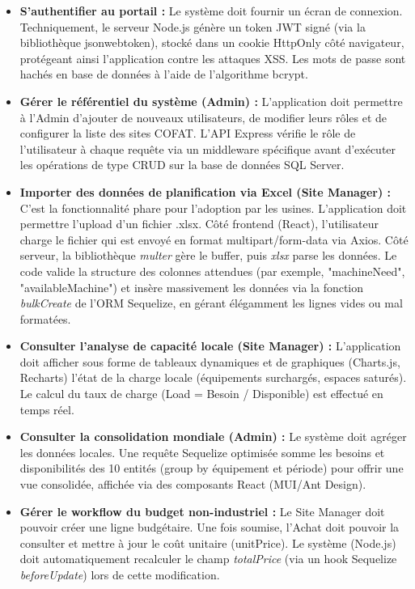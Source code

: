 \begin{itemize}
    \item \textbf{S'authentifier au portail :} Le système doit fournir un écran de connexion. Techniquement, le serveur Node.js génère un token JWT signé (via la bibliothèque jsonwebtoken), stocké dans un cookie HttpOnly côté navigateur, protégeant ainsi l'application contre les attaques XSS. Les mots de passe sont hachés en base de données à l'aide de l'algorithme bcrypt.
    
    \item \textbf{Gérer le référentiel du système (Admin) :} L'application doit permettre à l'Admin d'ajouter de nouveaux utilisateurs, de modifier leurs rôles et de configurer la liste des sites COFAT. L'API Express vérifie le rôle de l'utilisateur à chaque requête via un middleware spécifique avant d'exécuter les opérations de type CRUD sur la base de données SQL Server.
    
    \item \textbf{Importer des données de planification via Excel (Site Manager) :} C'est la fonctionnalité phare pour l'adoption par les usines. L'application doit permettre l'upload d'un fichier .xlsx. Côté frontend (React), l'utilisateur charge le fichier qui est envoyé en format multipart/form-data via Axios. Côté serveur, la bibliothèque \textit{multer} gère le buffer, puis \textit{xlsx} parse les données. Le code valide la structure des colonnes attendues (par exemple, "machineNeed", "availableMachine") et insère massivement les données via la fonction \textit{bulkCreate} de l'ORM Sequelize, en gérant élégamment les lignes vides ou mal formatées.
    
    \item \textbf{Consulter l'analyse de capacité locale (Site Manager) :} L'application doit afficher sous forme de tableaux dynamiques et de graphiques (Charts.js, Recharts) l'état de la charge locale (équipements surchargés, espaces saturés). Le calcul du taux de charge (Load = Besoin / Disponible) est effectué en temps réel.
    
    \item \textbf{Consulter la consolidation mondiale (Admin) :} Le système doit agréger les données locales. Une requête Sequelize optimisée somme les besoins et disponibilités des 10 entités (group by équipement et période) pour offrir une vue consolidée, affichée via des composants React (MUI/Ant Design).
    
    \item \textbf{Gérer le workflow du budget non-industriel :} Le Site Manager doit pouvoir créer une ligne budgétaire. Une fois soumise, l'Achat doit pouvoir la consulter et mettre à jour le coût unitaire (unitPrice). Le système (Node.js) doit automatiquement recalculer le champ \textit{totalPrice} (via un hook Sequelize \textit{beforeUpdate}) lors de cette modification.
    

\end{itemize}
